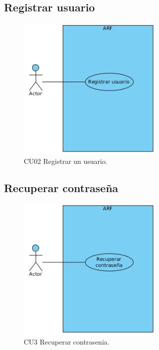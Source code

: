 \subsection{Registrar usuario} 
\vspace{5mm} 	
\begin{figure}[h!]
	\centering
	\includegraphics[width=7cm,height=7cm]{imagenes/analisis/registrarUsuario.jpg}
	\caption{CU02 Registrar un usuario.\cite{B27}}
	\label{fig:analogo}
\end{figure} 
\newpage
\subsection{Recuperar contraseña} 
\vspace{5mm}
\begin{figure}[h!]
	\centering
	\includegraphics[width=7cm,height=7cm]{imagenes/analisis/recuperarContrasenia.jpg}
	\caption{CU3 Recuperar contrasenia.\cite{B27}}
	\label{fig:analogo}
\end{figure}

